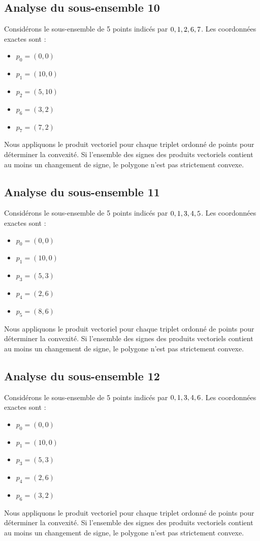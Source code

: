 \documentclass[11pt]{article}
\begin{document}
\subsection{Analyse du sous-ensemble 10}
Considérons le sous-ensemble de 5 points indicés par $\\{ 0, 1, 2, 6, 7 \\}$.
Les coordonnées exactes sont :
\begin{itemize}
\item $p_0 = (0, 0)$
\item $p_1 = (10, 0)$
\item $p_2 = (5, 10)$
\item $p_6 = (3, 2)$
\item $p_7 = (7, 2)$
\end{itemize}
Nous appliquons le produit vectoriel pour chaque triplet ordonné de points pour déterminer la convexité. Si l'ensemble des signes des produits vectoriels contient au moins un changement de signe, le polygone n'est pas strictement convexe.
\newpage

\subsection{Analyse du sous-ensemble 11}
Considérons le sous-ensemble de 5 points indicés par $\\{ 0, 1, 3, 4, 5 \\}$.
Les coordonnées exactes sont :
\begin{itemize}
\item $p_0 = (0, 0)$
\item $p_1 = (10, 0)$
\item $p_3 = (5, 3)$
\item $p_4 = (2, 6)$
\item $p_5 = (8, 6)$
\end{itemize}
Nous appliquons le produit vectoriel pour chaque triplet ordonné de points pour déterminer la convexité. Si l'ensemble des signes des produits vectoriels contient au moins un changement de signe, le polygone n'est pas strictement convexe.
\newpage

\subsection{Analyse du sous-ensemble 12}
Considérons le sous-ensemble de 5 points indicés par $\\{ 0, 1, 3, 4, 6 \\}$.
Les coordonnées exactes sont :
\begin{itemize}
\item $p_0 = (0, 0)$
\item $p_1 = (10, 0)$
\item $p_3 = (5, 3)$
\item $p_4 = (2, 6)$
\item $p_6 = (3, 2)$
\end{itemize}
Nous appliquons le produit vectoriel pour chaque triplet ordonné de points pour déterminer la convexité. Si l'ensemble des signes des produits vectoriels contient au moins un changement de signe, le polygone n'est pas strictement convexe.
\newpage
\end{document}
